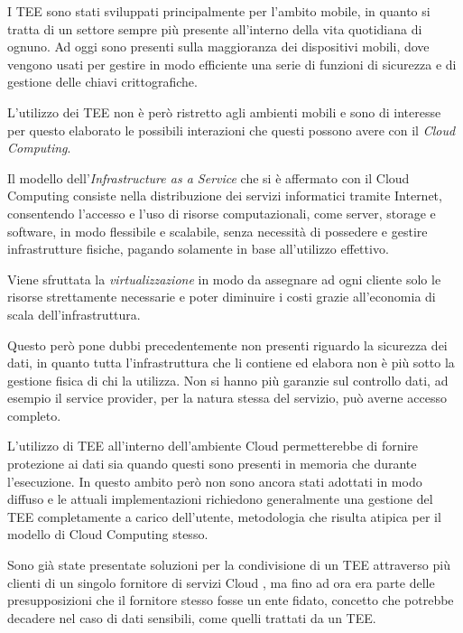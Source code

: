 \documentclass[12pt,italian]{report}
\begin{document}
	I TEE sono stati sviluppati principalmente per l'ambito mobile, in quanto si tratta di un settore sempre più presente all'interno della vita quotidiana di ognuno. Ad oggi sono presenti sulla maggioranza dei dispositivi mobili, dove vengono usati per gestire in modo efficiente una serie di funzioni di sicurezza e di gestione delle chiavi crittografiche. 
	
	\bigbreak
	
	L'utilizzo dei TEE non è però ristretto agli ambienti mobili e sono di interesse per questo elaborato le possibili interazioni che questi possono avere con il \textit{Cloud Computing}.
	
	Il modello dell'\textit{Infrastructure as a Service} che si è affermato con il Cloud Computing consiste nella distribuzione dei servizi informatici tramite Internet, consentendo l'accesso e l'uso di risorse computazionali, come server, storage e software, in modo flessibile e scalabile, senza necessità di possedere e gestire infrastrutture fisiche, pagando solamente in base all'utilizzo effettivo.
	
	Viene sfruttata la \textit{virtualizzazione} in modo da assegnare ad ogni cliente solo le risorse strettamente necessarie e poter diminuire i costi grazie all'economia di scala dell'infrastruttura.
	
	\bigbreak
	
	Questo però pone dubbi precedentemente non presenti riguardo la sicurezza dei dati, in quanto tutta l'infrastruttura che li contiene ed elabora non è più sotto la gestione fisica di chi la utilizza. Non si hanno più garanzie sul controllo dati, ad esempio il service provider, per la natura stessa del servizio, può averne accesso completo.
	
	\bigbreak 
	
	L'utilizzo di TEE all'interno dell'ambiente Cloud permetterebbe di fornire protezione ai dati sia quando questi sono presenti in memoria che durante l'esecuzione. In questo ambito però non sono ancora stati adottati in modo diffuso e le attuali implementazioni richiedono generalmente una gestione del TEE completamente a carico dell'utente, metodologia che risulta atipica per il modello di Cloud Computing stesso.
	
	\bigbreak
	
	Sono già state presentate soluzioni per la condivisione di un TEE attraverso più clienti di un singolo fornitore di servizi Cloud \cite{tesi_cutecchia}, ma fino ad ora era parte delle presupposizioni che il fornitore stesso fosse un ente fidato, concetto che potrebbe decadere nel caso di dati sensibili, come quelli trattati da un TEE.
	
\end{document}
